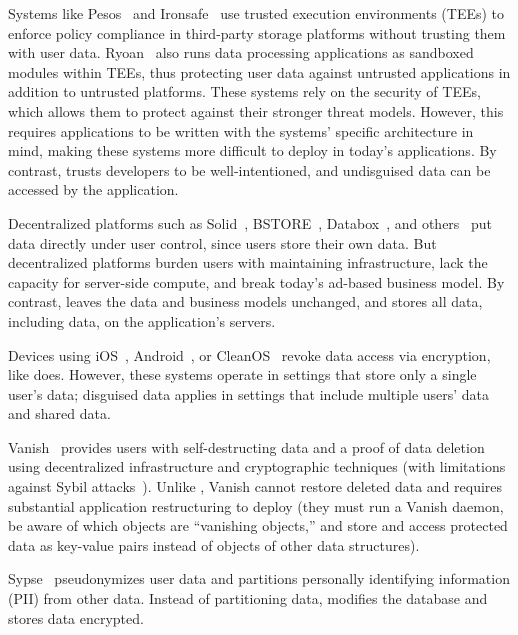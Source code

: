 %
Systems like Pesos~\cite{pesos} and Ironsafe~\cite{ironsafe} use trusted
execution environments (TEEs) to enforce policy compliance in third-party
storage platforms without trusting them with user data. 
%
Ryoan~\cite{ryoan} also runs data processing applications as sandboxed modules
within TEEs, thus protecting user data against untrusted applications in
addition to untrusted platforms.
%
These systems rely on the security of TEEs, which allows them to protect against
their stronger threat models. However, this requires applications to be written
with the systems' specific architecture in mind, making these systems more
difficult to deploy in today's applications.
%
By contrast, \sys trusts developers to be well-intentioned, and undisguised data
can be accessed by the application.
%

Decentralized platforms such as Solid~\cite{solid}, BSTORE~\cite{bstore},
Databox~\cite{databox}, and others~\cite{diy, amber, oort, w5, blockstack} put
data directly under user control, since users store their own data.
%
But decentralized platforms burden users with maintaining infrastructure, lack
the capacity for server-side compute, and break today's ad-based
business model.
%
By contrast, \sys leaves the data and business models unchanged,
and stores all data, including \xxed data, on the application's servers.
%

%
Devices using iOS~\cite{applesecurity}, Android~\cite{applesecurity}, or
CleanOS~\cite{cleanos} revoke data access via encryption, like \sys does.
%
However, these systems operate in settings that store only a single user's data;
disguised data applies in settings that include multiple users' data and shared
data.
%

%
Vanish~\cite{vanish} provides users with self-destructing data and a proof of
data deletion using decentralized infrastructure and cryptographic techniques
(with limitations against Sybil attacks~\cite{defeat_vanish}). Unlike \sys,
Vanish cannot restore deleted data and requires substantial application
restructuring to deploy (\eg they must run a Vanish daemon, be aware of which
objects are ``vanishing objects,'' and store and access protected data
as key-value pairs instead of objects of other data structures).
%

%
Sypse~\cite{sypse} pseudonymizes user data and partitions personally identifying
information (PII) from other data. Instead of partitioning data, \sys modifies
the database and stores \xxed data encrypted.
%

